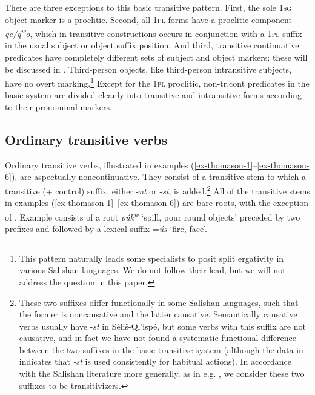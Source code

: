 \documentclass[output=paper,colorlinks,citecolor=brown]{langscibook}
\begin{document}
There are three exceptions to this basic transitive pattern.  First,
the sole \textsc{1sg} object marker is a proclitic.  Second, all \textsc{1pl} forms have
a proclitic component \emph{qe/{q\textsuperscript w}o}, which in
transitive constructions occurs in conjunction with a \textsc{1pl} suffix in the
usual subject or object suffix position.  And third, transitive
continuative predicates have completely different sets of subject and
object markers; these will be discussed in .  Third-person
objects, like third-person intransitive subjects, have no overt
marking.\footnote{This pattern naturally leads some specialists to
posit split ergativity in various Salishan languages.  We do not
follow their lead, but we will not address the question in this
paper.}  Except for the \textsc{1pl} proclitic, non-tr.cont predicates in
the basic system are divided cleanly into transitive and intransitive
forms according to their pronominal markers.

\subsection{Ordinary transitive verbs}  %
\label{thomason_section_2.1}

  Ordinary transitive verbs, illustrated in examples (\ref{ex-thomason-1}--\ref{ex-thomason-6}), are aspectually
  noncontinuative.  They consist of a transitive stem to which a
  transitive (+ control) suffix, either -\emph{nt} or -\emph{st}, is
  added.\footnote{These two suffixes differ functionally in some
  Salishan languages, such that the former is noncausative and the
  latter causative.  Semantically causative verbs usually have
  -\emph{st} in S\'eli\v{s}-Ql'isp\'e, but some verbs with this
  suffix are not causative, and in fact we have not found a
  systematic functional difference between the two suffixes in the
  basic transitive system (although the data in
  \citet{Mengarinietal.:1877} indicates that \emph{-st} is used
  consistently for habitual actions). In accordance with the Salishan
  literature more generally, as in
  e.g. , we consider these
  two suffixes to be transitivizers.}  All of the transitive stems in
  examples (\ref{ex-thomason-1}--\ref{ex-thomason-6}) are bare roots, with the exception of .  Example  consists
  of a root \emph{p\'uk\textsuperscript w} `spill, pour round
  objects' preceded by two prefixes and followed by a lexical suffix
  =\emph{\'us} `fire, face'.
\end{document}
